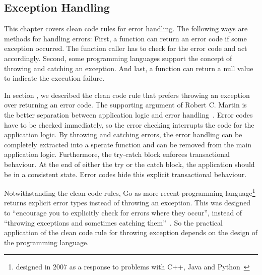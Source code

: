 \subsection{Exception Handling}\label{sec:background:returning_none_and_error_handling}
This chapter covers clean code rules for error handling. The following ways are methods for handling errors:
First, a function can return an error code if some exception occurred. The function caller has to check for the error code and act accordingly. Second, some programming languages support the concept of throwing and catching an exception. And last, a function can return a null value to indicate the execution failure. 

In section , we described the clean code rule that prefers throwing an exception over returning an error code. The supporting argument of Robert C. Martin is the better separation between application logic and error handling~\cite{martin_clean_2009}. Error codes have to be checked immediately, so the error checking interrupts the code for the application logic. By throwing and catching errors, the error handling can be completely extracted into a sperate function and can be removed from the main application logic. Furthermore, the try-catch block enforces transactional behaviour. At the end of either the try or the catch block, the application should be in a consistent state. Error codes hide this explicit transactional behaviour. 

Notwithstanding the clean code rules, Go as more recent programming language\footnote{designed in 2007 as a response to problems with C++, Java and Python~\cite{noauthor_go_nodate}} returns explicit error types instead of throwing an exception. This was designed to \enquote{encourage you to explicitly check for errors where they occur}, instead of \enquote{throwing exceptions and sometimes catching them}~\cite{gerrand_error_2011}.   
So the practical application of the clean code rule for throwing exception depends on the design of the programming language.

